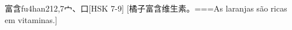 \begin{EntryWithPhonetic}{富含}{fu4han2}{12,7}{⼧、⼝}[HSK 7-9]
  [橘子富含维生素。===As laranjas são ricas em vitaminas.]
\end{EntryWithPhonetic}
